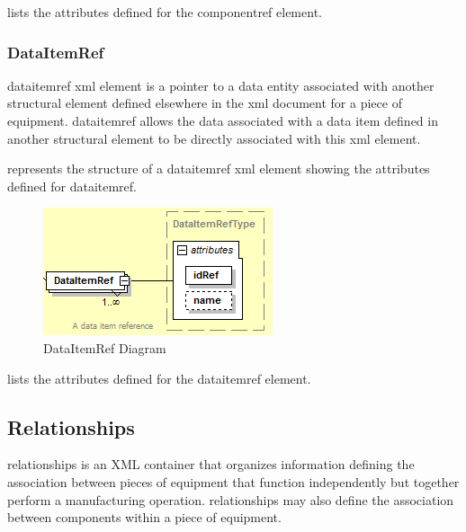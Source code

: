 \FloatBarrier

 lists the attributes defined for the \gls{componentref} element. 



\subsubsection{DataItemRef}

\gls{dataitemref} \gls{xml} element is a pointer to a \gls{data entity} associated with another \gls{structural element} defined elsewhere in the \gls{xml} document for a piece of equipment.  \gls{dataitemref} allows the data associated with a data item defined in another \gls{structural element} to be directly associated with this \gls{xml} element.

 represents the structure of a \gls{dataitemref} \gls{xml} element showing the attributes defined for \gls{dataitemref}.

\begin{figure}[ht]
  \centering
  \includegraphics[width=.5\textwidth]{figures/dataitemref-schema-diagram.png}
  \caption{DataItemRef Diagram}
  \label{fig:dataitemref-schema-diagram}
\end{figure}

\FloatBarrier

 lists the attributes defined for the \gls{dataitemref} element. 



\newpage

\subsection{Relationships}
\label{sec:Relationships}

\gls{relationships} is an XML container that organizes information defining the association between pieces of equipment that function independently but together perform a manufacturing operation.  \gls{relationships} may also define the association between components within a piece of equipment.
 
